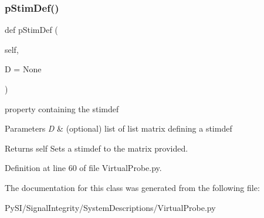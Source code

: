 \subsubsection{\texorpdfstring{p\+Stim\+Def()}{pStimDef()}}
{\footnotesize\ttfamily def p\+Stim\+Def (\begin{DoxyParamCaption}\item[{}]{self,  }\item[{}]{D = {\ttfamily None} }\end{DoxyParamCaption})}



property containing the stimdef 


\begin{DoxyParams}{Parameters}
{\em D} & (optional) list of list matrix defining a stimdef \\
\hline
\end{DoxyParams}
\begin{DoxyReturn}{Returns}
self Sets a stimdef to the matrix provided. 
\end{DoxyReturn}


Definition at line 60 of file Virtual\+Probe.\+py.



The documentation for this class was generated from the following file\+:\begin{DoxyCompactItemize}
\item 
Py\+S\+I/\+Signal\+Integrity/\+System\+Descriptions/Virtual\+Probe.\+py\end{DoxyCompactItemize}
